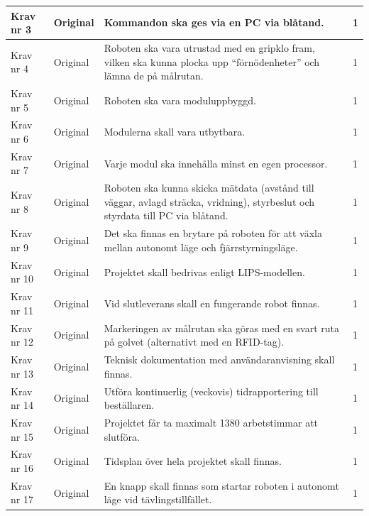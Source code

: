 \documentclass[11pt]{article}
\begin{document}
\begin{flushleft}
\begin{center}
\begin{longtable}{|l|l|p{.70\linewidth}|l|}
Krav nr 3 &
Original &
Kommandon ska ges via en PC via blåtand. &
1 \\ \hline

Krav nr 4 &
Original &
Roboten ska vara utrustad med en gripklo fram, vilken ska kunna plocka upp “förnödenheter” och lämna de på målrutan. &
1 \\ \hline

Krav nr 5 &
Original &
Roboten ska vara moduluppbyggd. &
1 \\ \hline

Krav nr 6 &
Original &
Modulerna skall vara utbytbara. &
1 \\ \hline

Krav nr 7 &
Original &
Varje modul ska innehålla minst en egen processor. &
1 \\ \hline

Krav nr 8 &
Original &
Roboten ska kunna skicka mätdata (avstånd till väggar, avlagd sträcka, vridning), styrbeslut och styrdata till PC via blåtand. &
1 \\ \hline

Krav nr 9 &
Original &
Det ska finnas en brytare på roboten för att växla mellan autonomt läge och fjärrstyrningsläge. &
1 \\ \hline

Krav nr 10 &
Original & 
Projektet skall bedrivas enligt LIPS-modellen.&
1 \\ \hline

Krav nr 11 &
Original &
Vid slutleverans skall en fungerande robot finnas. &
1 \\ \hline

Krav nr 12 &
Original &
Markeringen av målrutan ska göras med en svart ruta på golvet (alternativt med en RFID-tag). &
1 \\ \hline

Krav nr 13 & 
Original & 
Teknisk dokumentation med användaranvisning skall finnas. &
1 \\ \hline

Krav nr 14 &
Original &
Utföra kontinuerlig (veckovis) tidrapportering till beställaren. &
1 \\ \hline

Krav nr 15 &
Original &
Projektet får ta maximalt 1380 arbetstimmar att slutföra. &
1 \\ \hline

Krav nr 16 &
Original &
Tidsplan över hela projektet skall finnas. &
1 \\ \hline

Krav nr 17 &
Original &
En knapp skall finnas som startar roboten i autonomt läge vid tävlingstillfället. &
1 \\ \hline


\end{longtable}
\end{center}
\end{flushleft}
\end{document}
